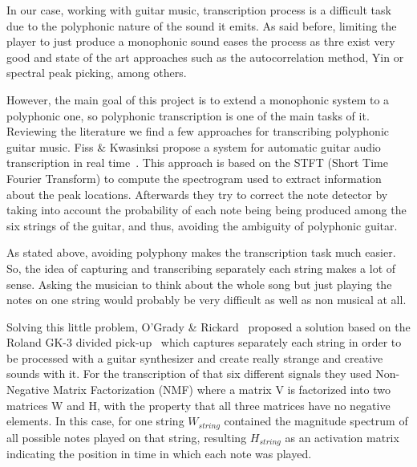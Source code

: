 In our case, working with guitar music, transcription process is a difficult task due to the polyphonic nature of the sound it emits.
As said before, limiting the player to just produce a monophonic sound eases the process as thre exist very good and state of the art approaches such as the autocorrelation method, Yin or spectral peak picking, among others.

However, the main goal of this project is to extend a monophonic system to a polyphonic one, so polyphonic transcription is one of the main tasks of it. Reviewing the literature we find a few approaches for transcribing polyphonic guitar music. Fiss \& Kwasinksi propose a system for automatic guitar audio transcription in real time~\cite{Fiss2011}. This approach is based on the STFT (Short Time Fourier Transform) to compute the spectrogram used to extract information about the peak locations. Afterwards they try to correct the note detector by taking into account the probability of each note being being produced among the six strings of the guitar, and thus, avoiding the ambiguity of polyphonic guitar.
 
As stated above, avoiding polyphony makes the transcription task much easier. So, the idea of capturing and transcribing separately each string makes a lot of sense. Asking the musician to think about the whole song but just playing the notes on one string would probably be very difficult as well as non musical at all. 

Solving this little problem, O'Grady \& Rickard~\cite{OGrady2009} proposed a solution based on the Roland GK-3 divided pick-up~\cite{gk3} which captures separately each string in order to be processed with a guitar synthesizer and create really strange and creative sounds with it. For the transcription of that six different signals they used Non-Negative Matrix Factorization (NMF) where a matrix V is factorized into two matrices W and H, with the property that all three matrices have no negative elements. In this case, for one string $W_{string}$ contained the magnitude spectrum of all possible notes played on that string, resulting $H_{string}$ as an activation matrix indicating the position in time in which each note was played.
















\cleardoublepage